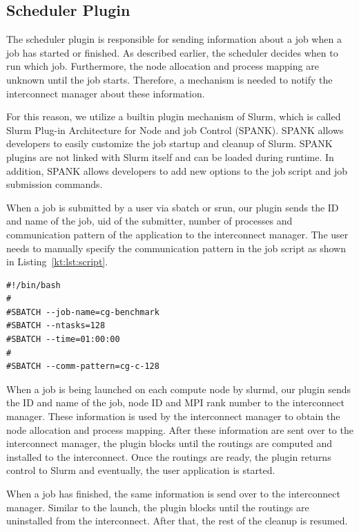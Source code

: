 \documentclass[graybox]{svmult}
\begin{document}
\subsection{Scheduler Plugin}

The scheduler plugin is responsible for sending information about a job when a
job has started or finished. As described earlier, the scheduler decides when
to run which job. Furthermore, the node allocation and process mapping are
unknown until the job starts. Therefore, a mechanism is needed to notify the
interconnect manager about these information.

For this reason, we utilize a builtin plugin mechanism of Slurm, which is
called Slurm Plug-in Architecture for Node and job Control (SPANK). SPANK
allows developers to easily customize the job startup and cleanup of Slurm.
SPANK plugins are not linked with Slurm itself and can be loaded during
runtime. In addition, SPANK allows developers to add new options to the job
script and job submission commands.

When a job is submitted by a user via sbatch or srun, our plugin sends the ID
and name of the job, uid of the submitter, number of processes and
communication pattern of the application to the interconnect manager. The user
needs to manually specify the communication pattern in the job script as shown
in Listing~\ref{kt:lst:script}.

\begin{lstlisting}[float,caption=An example of a job script,label=kt:lst:script]
#!/bin/bash
#
#SBATCH --job-name=cg-benchmark
#SBATCH --ntasks=128
#SBATCH --time=01:00:00
#
#SBATCH --comm-pattern=cg-c-128
\end{lstlisting}

When a job is being launched on each compute node by slurmd, our plugin sends
the ID and name of the job, node ID and MPI rank number to the interconnect
manager. These information is used by the interconnect manager to obtain the
node allocation and process mapping. After these information are sent over to
the interconnect manager, the plugin blocks until the routings are computed
and installed to the interconnect. Once the routings are ready, the plugin
returns control to Slurm and eventually, the user application is started.

When a job has finished, the same information is send over to the interconnect
manager. Similar to the launch, the plugin blocks until the routings are
uninstalled from the interconnect. After that, the rest of the cleanup is
resumed.
\end{document}
